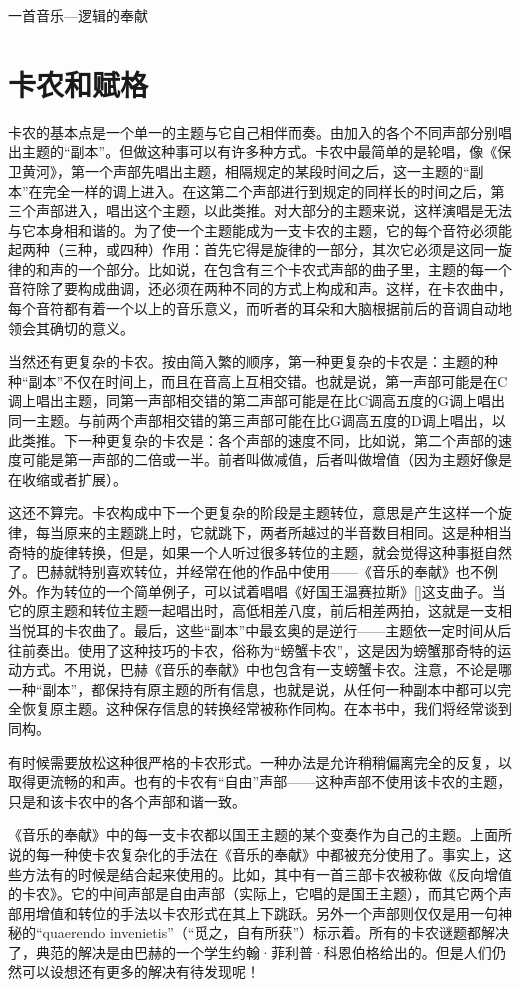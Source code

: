 \begin{intro}{一首音乐—逻辑的奉献}
\section{卡农和赋格}

卡农的基本点是一个单一的主题与它自己相伴而奏。由加入的各个不同声部分别唱出主题的“副本”。但做这种事可以有许多种方式。卡农中最简单的是轮唱，像《保卫黄河》，第一个声部先唱出主题，相隔规定的某段时间之后，这一主题的“副本”在完全一样的调上进入。在这第二个声部进行到规定的同样长的时间之后，第三个声部进入，唱出这个主题，以此类推。对大部分的主题来说，这样演唱是无法与它本身相和谐的。为了使一个主题能成为一支卡农的主题，它的每个音符必须能起两种（三种，或四种）作用：首先它得是旋律的一部分，其次它必须是这同一旋律的和声的一个部分。比如说，在包含有三个卡农式声部的曲子里，主题的每一个音符除了要构成曲调，还必须在两种不同的方式上构成和声。这样，在卡农曲中，每个音符都有着一个以上的音乐意义，而听者的耳朵和大脑根据前后的音调自动地领会其确切的意义。

当然还有更复杂的卡农。按由简入繁的顺序，第一种更复杂的卡农是：主题的种种“副本”不仅在时间上，而且在音高上互相交错。也就是说，第一声部可能是在C调上唱出主题，同第一声部相交错的第二声部可能是在比C调高五度的G调上唱出同一主题。与前两个声部相交错的第三声部可能在比G调高五度的D调上唱出，以此类推。下一种更复杂的卡农是：各个声部的速度不同，比如说，第二个声部的速度可能是第一声部的二倍或一半。前者叫做减值，后者叫做增值（因为主题好像是在收缩或者扩展）。

这还不算完。卡农构成中下一个更复杂的阶段是主题转位，意思是产生这样一个旋律，每当原来的主题跳上时，它就跳下，两者所越过的半音数目相同。这是种相当奇特的旋律转换，但是，如果一个人听过很多转位的主题，就会觉得这种事挺自然了。巴赫就特别喜欢转位，并经常在他的作品中使用——《音乐的奉献》也不例外。作为转位的一个简单例子，可以试着唱唱《好国王温赛拉斯》[]这支曲子。当它的原主题和转位主题一起唱出时，高低相差八度，前后相差两拍，这就是一支相当悦耳的卡农曲了。最后，这些“副本”中最玄奥的是逆行——主题依一定时间从后往前奏出。使用了这种技巧的卡农，俗称为“螃蟹卡农”，这是因为螃蟹那奇特的运动方式。不用说，巴赫《音乐的奉献》中也包含有一支螃蟹卡农。注意，不论是哪一种“副本”，都保持有原主题的所有信息，也就是说，从任何一种副本中都可以完全恢复原主题。这种保存信息的转换经常被称作同构。在本书中，我们将经常谈到同构。

有时候需要放松这种很严格的卡农形式。一种办法是允许稍稍偏离完全的反复，以取得更流畅的和声。也有的卡农有“自由”声部——这种声部不使用该卡农的主题，只是和该卡农中的各个声部和谐一致。

《音乐的奉献》中的每一支卡农都以国王主题的某个变奏作为自己的主题。上面所说的每一种使卡农复杂化的手法在《音乐的奉献》中都被充分使用了。事实上，这些方法有的时候是结合起来使用的。比如，其中有一首三部卡农被称做《反向增值的卡农》。它的中间声部是自由声部（实际上，它唱的是国王主题），而其它两个声部用增值和转位的手法以卡农形式在其上下跳跃。另外一个声部则仅仅是用一句神秘的“quaerendo invenietis”（“觅之，自有所获”）标示着。所有的卡农谜题都解决了，典范的解决是由巴赫的一个学生约翰·菲利普·科恩伯格给出的。但是人们仍然可以设想还有更多的解决有待发现呢！


\end{intro}
